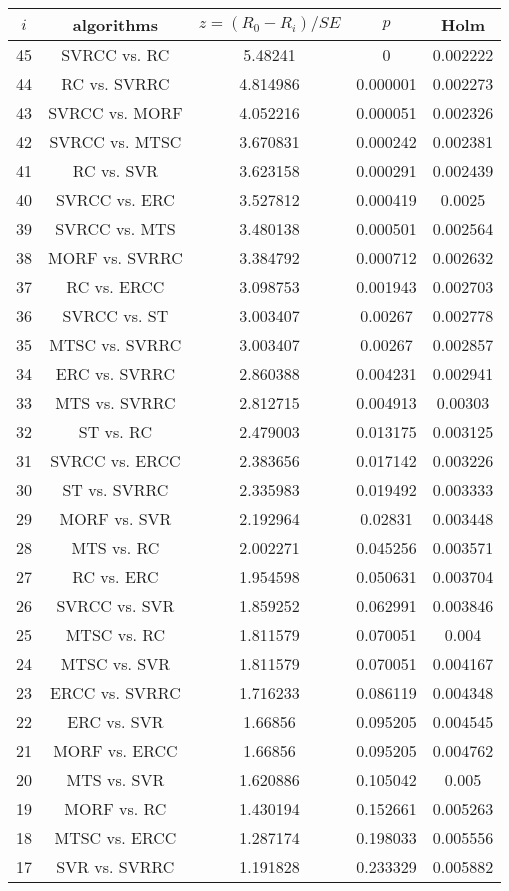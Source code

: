 \documentclass[a4paper,10pt]{article}
\begin{document}
\begin{landscape}
\begin{table}[!htp]
\centering\scriptsize
\begin{tabular}{ccccc}
$i$&algorithms&$z=(R_0 - R_i)/SE$&$p$&Holm\\
\hline45&SVRCC vs. RC&5.48241&0&0.002222\\
44&RC vs. SVRRC&4.814986&0.000001&0.002273\\
43&SVRCC vs. MORF&4.052216&0.000051&0.002326\\
42&SVRCC vs. MTSC&3.670831&0.000242&0.002381\\
41&RC vs. SVR&3.623158&0.000291&0.002439\\
40&SVRCC vs. ERC&3.527812&0.000419&0.0025\\
39&SVRCC vs. MTS&3.480138&0.000501&0.002564\\
38&MORF vs. SVRRC&3.384792&0.000712&0.002632\\
37&RC vs. ERCC&3.098753&0.001943&0.002703\\
36&SVRCC vs. ST&3.003407&0.00267&0.002778\\
35&MTSC vs. SVRRC&3.003407&0.00267&0.002857\\
34&ERC vs. SVRRC&2.860388&0.004231&0.002941\\
33&MTS vs. SVRRC&2.812715&0.004913&0.00303\\
32&ST vs. RC&2.479003&0.013175&0.003125\\
31&SVRCC vs. ERCC&2.383656&0.017142&0.003226\\
30&ST vs. SVRRC&2.335983&0.019492&0.003333\\
29&MORF vs. SVR&2.192964&0.02831&0.003448\\
28&MTS vs. RC&2.002271&0.045256&0.003571\\
27&RC vs. ERC&1.954598&0.050631&0.003704\\
26&SVRCC vs. SVR&1.859252&0.062991&0.003846\\
25&MTSC vs. RC&1.811579&0.070051&0.004\\
24&MTSC vs. SVR&1.811579&0.070051&0.004167\\
23&ERCC vs. SVRRC&1.716233&0.086119&0.004348\\
22&ERC vs. SVR&1.66856&0.095205&0.004545\\
21&MORF vs. ERCC&1.66856&0.095205&0.004762\\
20&MTS vs. SVR&1.620886&0.105042&0.005\\
19&MORF vs. RC&1.430194&0.152661&0.005263\\
18&MTSC vs. ERCC&1.287174&0.198033&0.005556\\
17&SVR vs. SVRRC&1.191828&0.233329&0.005882\\

\end{tabular}
\end{table}
\end{landscape}
\end{document}
